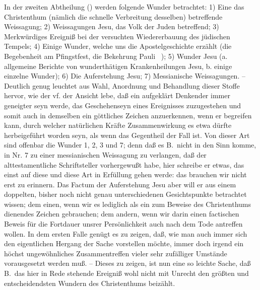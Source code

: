 In der zweiten Abtheilung () werden folgende Wunder betrachtet: 1) Eine das Christenthum (nämlich die schnelle Verbreitung desselben) betreffende Weissagung; 2) Weissagungen Jesu, das Volk der Juden betreffend; 3) Merkwürdiges Ereigniß bei der versuchten Wiedererbauung des jüdischen Tempels; 4) Einige Wunder, welche uns die Apostelgeschichte erzählt (die Begebenheit am Pfingstfest, die Bekehrung Pauli \ua\ ); 5) Wunder Jesu (a. allgemeine Berichte von wunderthätigen Krankenheilungen Jesu, b. einige einzelne Wunder); 6) Die Auferstehung Jesu; 7) Messianische Weissagungen. -- Deutlich genug leuchtet aus Wahl, Anordnung und Behandlung dieser Stoffe hervor, wie der vf. der Ansicht lebe, daß ein aufgeklärt Denkender immer geneigter seyn werde, das Geschehenseyn eines Ereignisses zuzugestehen und somit auch in demselben ein göttliches Zeichen anzuerkennen, wenn er begreifen kann, durch welcher natürlichen Kräfte Zusammenwirkung es etwa dürfte herbeigeführt worden seyn, als wenn das Gegentheil der Fall ist. Von dieser Art sind offenbar die Wunder 1, 2, 3 und 7; denn daß es B.\ nicht in den Sinn komme, in Nr. 7 zu einer messianischen Weissagung zu verlangen, daß der alttestamentliche Schriftsteller vorhergewußt habe, hier schreibe er etwas, das einst auf diese und diese Art in Erfüllung gehen werde: das brauchen wir nicht erst zu erinnern. Das Factum der Auferstehung Jesu aber will er aus einem doppelten, bisher noch nicht genau unterschiedenen Gesichtspunkte betrachtet wissen; dem einen, wenn wir es lediglich als ein zum Beweise des Christenthums dienendes Zeichen gebrauchen; dem andern, wenn wir darin einen factischen Beweis für die Fortdauer unsrer Persönlichkeit auch nach dem Tode antreffen wollen. In dem ersten Falle genügt es zu zeigen, daß, wie man auch immer sich den eigentlichen Hergang der Sache vorstellen möchte, immer doch irgend ein höchst ungewöhnliches Zusammentreffen vieler sehr zufälliger Umstände vorausgesetzt werden muß. -- Dieses zu zeigen, ist nun eine so leichte Sache, daß B.\ das hier in Rede stehende Ereigniß wohl nicht mit Unrecht den größten und entscheidendsten Wundern des Christenthums beizählt. \par
